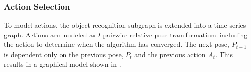         \subsubsection{Action Selection}
            To model actions, the object-recognition subgraph is extended into a time-series graph. Actions are modeled as $I$ pairwise relative pose transformations including the  action to determine when the algorithm has converged. The next pose, $P_{t+1}$ is dependent only on the previous pose, $P_t$ and the previous action $A_t$. This results in a graphical model shown in .
            







